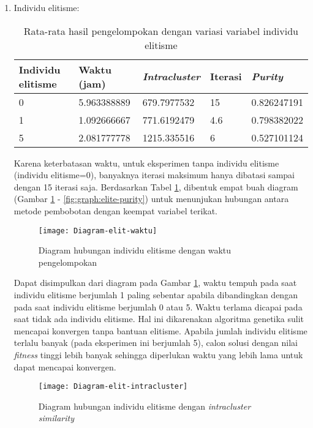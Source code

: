 \begin{enumerate}
		\newpage
		\item Individu elitisme:
		\begin{table}[H]
			\centering
			\caption{Rata-rata hasil pengelompokan dengan variasi variabel individu elitisme}
			\begin{tabular}{|l|l|l|l|l|} \hline
				Individu elitisme & Waktu (jam) & \textit{Intracluster} & Iterasi & \textit{Purity} \\ \hline
				0 & 5.963388889 & 679.7977532 & 15  & 0.826247191 \\ \hline
				1 & 1.092666667 & 771.6192479 & 4.6 & 0.798382022 \\ \hline
				5 & 2.081777778 & 1215.335516 & 6   & 0.527101124 \\ \hline
			\end{tabular}
			\label{tbl:exp-elitism}
		\end{table}
		
		Karena keterbatasan waktu, untuk eksperimen tanpa individu elitisme (individu elitisme=0), banyaknya iterasi maksimum hanya dibatasi sampai dengan 15 iterasi saja. Berdasarkan Tabel \ref{tbl:exp-elitism}, dibentuk empat buah diagram (Gambar \ref{fig:graph:elite-time} - \ref{fig:graph:elite-purity}) untuk menunjukan hubungan antara metode pembobotan dengan keempat variabel terikat.
		
		\begin{figure}[H]
			\centering
			\texttt{[image: Diagram-elit-waktu]}
			\caption{Diagram hubungan individu elitisme dengan waktu pengelompokan}
			\label{fig:graph:elite-time}
		\end{figure}
		
		Dapat disimpulkan dari diagram pada Gambar \ref{fig:graph:elite-time}, waktu tempuh pada saat individu elitisme berjumlah 1 paling sebentar apabila dibandingkan dengan pada saat individu elitisme berjumlah 0 atau 5. Waktu terlama dicapai pada saat tidak ada individu elitisme. Hal ini dikarenakan algoritma genetika sulit mencapai konvergen tanpa bantuan elitisme. Apabila jumlah individu elitisme terlalu banyak (pada eksperimen ini berjumlah 5), calon solusi dengan nilai \textit{fitness} tinggi lebih banyak sehingga diperlukan waktu yang lebih lama untuk dapat mencapai konvergen.
		
		\begin{figure}[H]
			\centering
			\texttt{[image: Diagram-elit-intracluster]}
			\caption{Diagram hubungan individu elitisme dengan \textit{intracluster similarity}}
			\label{fig:graph:elite-intra}
		\end{figure}
		

\end{enumerate}

